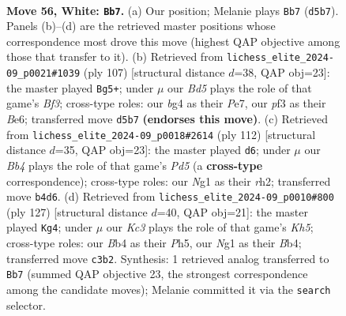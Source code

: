 \documentclass[11pt]{article}
\begin{document}
\clearpage

\begin{figure}[p]\centering
\begin{subfigure}{0.46\textwidth}\centering
\resizebox{\linewidth}{!}{%
\newchessgame
\chessboard[
  setfen={4k3/8/7r/3B4/PB4bp/1PK2p2/5R2/6N1 w - - 6 56},
  showmover=false,
  pgfstyle=straightmove, color=movearrow, markmove={d5-b7}
]}
\caption{}
\end{subfigure}\hfill
\begin{subfigure}{0.46\textwidth}\centering
\resizebox{\linewidth}{!}{%
\newchessgame
\chessboard[
  setfen={8/4p3/1k2bb2/p1p5/1r6/8/1P2R3/2K5 b - - 5 54},
  showmover=false,
  pgfstyle=straightmove, color=movearrow, markmove={f6-g5}
]}
\caption{}
\end{subfigure}
\\[4pt]
\begin{subfigure}{0.46\textwidth}\centering
\resizebox{\linewidth}{!}{%
\newchessgame
\chessboard[
  setfen={3k4/1p6/8/2PPK2p/4B2P/8/p6r/R7 w - - 1 57},
  showmover=false,
  pgfstyle=straightmove, color=movearrow, markmove={d5-d6}
]}
\caption{}
\end{subfigure}\hfill
\begin{subfigure}{0.46\textwidth}\centering
\resizebox{\linewidth}{!}{%
\newchessgame
\chessboard[
  setfen={8/8/8/p4p1p/Pb5k/1r6/1PR5/6K1 b - - 9 64},
  showmover=false,
  pgfstyle=straightmove, color=movearrow, markmove={h4-g4}
]}
\caption{}
\end{subfigure}
\caption{\textbf{Move 56, White: \texttt{Bb7}.} (a) Our position; Melanie plays \texttt{Bb7} (\texttt{d5b7}). Panels (b)--(d) are the retrieved master positions whose correspondence most drove this move (highest QAP objective among those that transfer to it). (b) Retrieved from \texttt{lichess\_elite\_2024-09\_p0021\#1039} (ply 107) [structural distance $d$=38, QAP obj=23]: the master played \texttt{Bg5+}; under $\mu$ our \emph{Bd5} plays the role of that game's \emph{Bf3}; cross-type roles: our \emph{b}g4 as their \emph{P}e7, our \emph{p}f3 as their \emph{B}e6; transferred move \texttt{d5b7} \textbf{(endorses this move)}. (c) Retrieved from \texttt{lichess\_elite\_2024-09\_p0018\#2614} (ply 112) [structural distance $d$=35, QAP obj=23]: the master played \texttt{d6}; under $\mu$ our \emph{Bb4} plays the role of that game's \emph{Pd5} (a \textbf{cross-type} correspondence); cross-type roles: our \emph{N}g1 as their \emph{r}h2; transferred move \texttt{b4d6}. (d) Retrieved from \texttt{lichess\_elite\_2024-09\_p0010\#800} (ply 127) [structural distance $d$=40, QAP obj=21]: the master played \texttt{Kg4}; under $\mu$ our \emph{Kc3} plays the role of that game's \emph{Kh5}; cross-type roles: our \emph{B}b4 as their \emph{P}h5, our \emph{N}g1 as their \emph{B}b4; transferred move \texttt{c3b2}. Synthesis: 1 retrieved analog transferred to \texttt{Bb7} (summed QAP objective 23, the strongest correspondence among the candidate moves); Melanie committed it via the \texttt{search} selector.}
\label{fig:thought-m110}
\end{figure}
\end{document}
